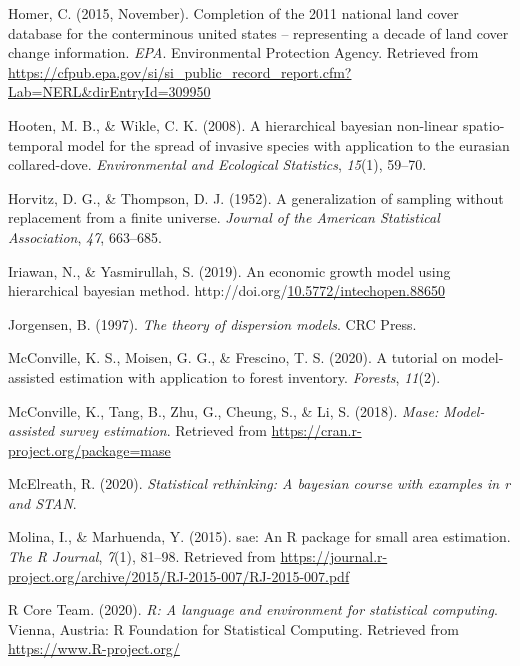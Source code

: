 \documentclass[12pt,twoside]{reedthesis}
\newlength{\cslhangindent}
\newenvironment{CSLReferences}[2] %
 {%
  \setlength{\parindent}{0pt}
  \ifodd #1 \everypar{\setlength{\hangindent}{\cslhangindent}}\ignorespaces\fi
  \ifnum #2 > 0
  \setlength{\parskip}{#2\baselineskip}
  \fi
 }%
 {}
\begin{document}
\begin{CSLReferences}{1}{0}
\leavevmode{}%
Homer, C. (2015, November). Completion of the 2011 national land cover database for the conterminous united states -- representing a decade of land cover change information. \emph{EPA}. Environmental Protection Agency. Retrieved from \url{https://cfpub.epa.gov/si/si_public_record_report.cfm?Lab=NERL\&dirEntryId=309950}

\leavevmode{}%
Hooten, M. B., \& Wikle, C. K. (2008). A hierarchical bayesian non-linear spatio-temporal model for the spread of invasive species with application to the eurasian collared-dove. \emph{Environmental and Ecological Statistics}, \emph{15}(1), 59--70.

\leavevmode{}%
Horvitz, D. G., \& Thompson, D. J. (1952). A generalization of sampling without replacement from a finite universe. \emph{Journal of the American Statistical Association}, \emph{47}, 663--685.

\leavevmode{}%
Iriawan, N., \& Yasmirullah, S. (2019). An economic growth model using hierarchical bayesian method. http://doi.org/\href{https://doi.org/10.5772/intechopen.88650}{10.5772/intechopen.88650}

\leavevmode{}%
Jorgensen, B. (1997). \emph{The theory of dispersion models}. CRC Press.

\leavevmode{}%
McConville, K. S., Moisen, G. G., \& Frescino, T. S. (2020). A tutorial on model-assisted estimation with application to forest inventory. \emph{Forests}, \emph{11}(2).

\leavevmode{}%
McConville, K., Tang, B., Zhu, G., Cheung, S., \& Li, S. (2018). \emph{Mase: Model-assisted survey estimation}. Retrieved from \url{https://cran.r-project.org/package=mase}

\leavevmode{}%
McElreath, R. (2020). \emph{Statistical rethinking: A bayesian course with examples in r and STAN}.

\leavevmode{}%
Molina, I., \& Marhuenda, Y. (2015). {sae}: An {R} package for small area estimation. \emph{The R Journal}, \emph{7}(1), 81--98. Retrieved from \url{https://journal.r-project.org/archive/2015/RJ-2015-007/RJ-2015-007.pdf}

\leavevmode{}%
R Core Team. (2020). \emph{R: A language and environment for statistical computing}. Vienna, Austria: R Foundation for Statistical Computing. Retrieved from \url{https://www.R-project.org/}


\end{CSLReferences}
\end{document}
